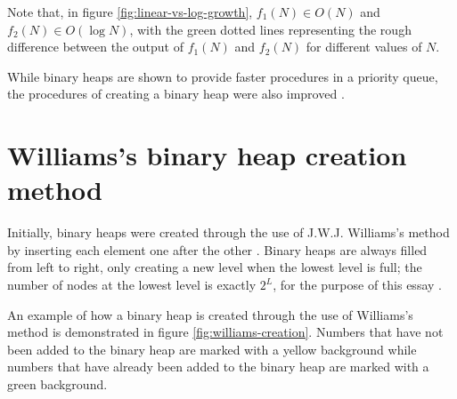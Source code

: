 \documentclass[12pt]{article}
\begin{document}
Note that, in figure \ref{fig:linear-vs-log-growth}, $f_1(N) \in O(N)$ and $f_2(N) \in O(\log N)$, with the green dotted lines representing the rough difference between the output of $f_1(N)$ and $f_2(N)$ for different values of $N$.\newline

While binary heaps are shown to provide faster procedures in a priority queue, the procedures of creating a binary heap were also improved \parencite[58]{JCC}.

\section{Williams's binary heap creation method}
Initially, binary heaps were created through the use of J.W.J. Williams’s method by inserting each element one after the other \parencites[4]{nus}[58]{JCC}. Binary heaps are always filled from left to right, only creating a new level when the lowest level is full; the number of nodes at the lowest level is exactly $2^L$, for the purpose of this essay \parencite{cornell_fall_2020}.\newline

An example of how a binary heap is created through the use of Williams's method is demonstrated in figure \ref{fig:williams-creation}. Numbers that have not been added to the binary heap are marked with a yellow background while numbers that have already been added to the binary heap are marked with a green background.
\end{document}
